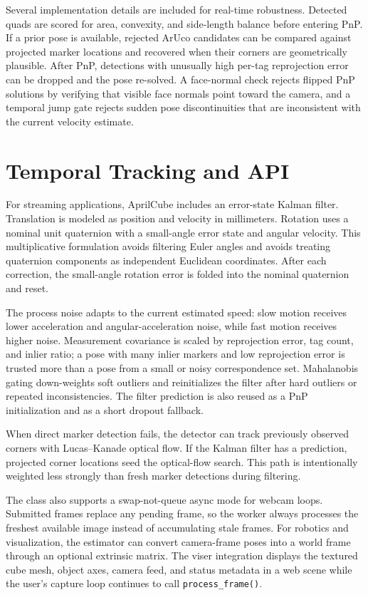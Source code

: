 \documentclass[conference]{IEEEtran}
\begin{document}
Several implementation details are included for real-time robustness. Detected quads are scored for area, convexity, and side-length balance before entering PnP. If a prior pose is available, rejected ArUco candidates can be compared against projected marker locations and recovered when their corners are geometrically plausible. After PnP, detections with unusually high per-tag reprojection error can be dropped and the pose re-solved. A face-normal check rejects flipped PnP solutions by verifying that visible face normals point toward the camera, and a temporal jump gate rejects sudden pose discontinuities that are inconsistent with the current velocity estimate.

\section{Temporal Tracking and API}
For streaming applications, AprilCube includes an error-state Kalman filter. Translation is modeled as position and velocity in millimeters. Rotation uses a nominal unit quaternion with a small-angle error state and angular velocity. This multiplicative formulation avoids filtering Euler angles and avoids treating quaternion components as independent Euclidean coordinates. After each correction, the small-angle rotation error is folded into the nominal quaternion and reset.

The process noise adapts to the current estimated speed: slow motion receives lower acceleration and angular-acceleration noise, while fast motion receives higher noise. Measurement covariance is scaled by reprojection error, tag count, and inlier ratio; a pose with many inlier markers and low reprojection error is trusted more than a pose from a small or noisy correspondence set. Mahalanobis gating down-weights soft outliers and reinitializes the filter after hard outliers or repeated inconsistencies. The filter prediction is also reused as a PnP initialization and as a short dropout fallback.

When direct marker detection fails, the detector can track previously observed corners with Lucas--Kanade optical flow. If the Kalman filter has a prediction, projected corner locations seed the optical-flow search. This path is intentionally weighted less strongly than fresh marker detections during filtering.

The class also supports a swap-not-queue async mode for webcam loops. Submitted frames replace any pending frame, so the worker always processes the freshest available image instead of accumulating stale frames. For robotics and visualization, the estimator can convert camera-frame poses into a world frame through an optional extrinsic matrix. The viser integration displays the textured cube mesh, object axes, camera feed, and status metadata in a web scene while the user's capture loop continues to call \texttt{process\_frame()}.
\end{document}
